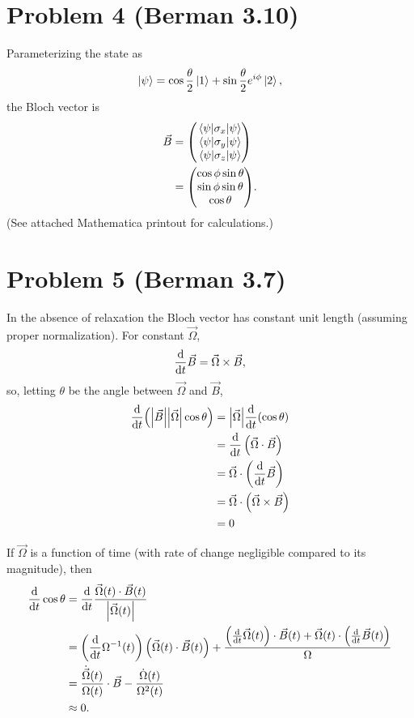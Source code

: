 \documentclass[12pt]{article}
\begin{document}
\section*{Problem 4 (Berman 3.10)}
Parameterizing the state as
\[ \ket{\psi} = \cos\frac{\theta}{2}\ket{1} + \sin\frac{\theta}{2}e^{i\phi}\ket{2}, \]
the Bloch vector is
\begin{align*}
    \vec{B} &= \mqty(\mel{\psi}{\sigma_x}{\psi} \\ \mel{\psi}{\sigma_y}{\psi} \\ \mel{\psi}{\sigma_z}{\psi}) \\
    &= \mqty(\cos\phi\sin\theta\\\sin\phi\sin\theta\\\cos\theta).
\end{align*}
(See attached Mathematica printout for calculations.)

\section*{Problem 5 (Berman 3.7)}
In the absence of relaxation the Bloch vector has constant unit length (assuming proper normalization). For constant $\vec{\Omega}$,
\[ \dv{t}\vec{B} = \vec{\Omega}\times\vec{B}, \]
so, letting $\theta$ be the angle between $\vec\Omega$ and $\vec{B}$,
\begin{align*}
    \dv{t}(\abs{\vec{B}}\abs{\vec\Omega}\cos\theta) &= \abs{\vec\Omega}\dv{t}(\cos\theta) \\
    &= \dv{t}\left(\vec\Omega\cdot\vec{B}\right) \\
    &= \vec\Omega\cdot\left(\dv{t}\vec{B}\right) \\
    &= \vec\Omega\cdot\left(\vec{\Omega}\times\vec{B}\right) \\
    &= 0
\end{align*}

If $\vec\Omega$ is a function of time (with rate of change negligible compared to its magnitude), then
\begin{align*}
    \dv{t}\cos\theta &= \dv{t}\frac{\vec\Omega(t)\cdot\vec{B}(t)}{\abs{\vec\Omega(t)}} \\
    &= \left(\dv{t}\Omega^{-1}(t)\right)\left(\vec\Omega(t)\cdot\vec{B}(t)\right) + \frac{\left(\dv{t}\vec\Omega(t)\right)\cdot\vec{B}(t) + \vec\Omega(t)\cdot\left(\dv{t}\vec{B}(t)\right)}{\Omega} \\
    &= \frac{\dot{\vec{\Omega}}(t)}{\Omega(t)}\cdot\vec{B} -\frac{\dot\Omega(t)}{\Omega^2(t)} \\
    &\approx 0.
\end{align*}


\end{document}
